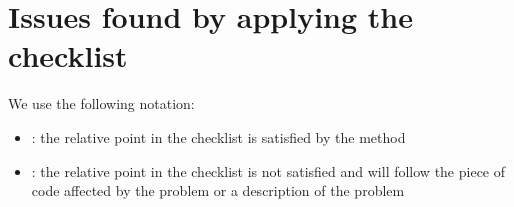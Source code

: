 \section{Issues found by applying the checklist}
We use the following notation:
\begin{itemize}
	\item \cmark: the relative point in the checklist is satisfied by the method
	\item \xmark: the relative point in the checklist is not satisfied and will follow the piece of code affected
	by the problem or a description of the problem
\end{itemize}






















